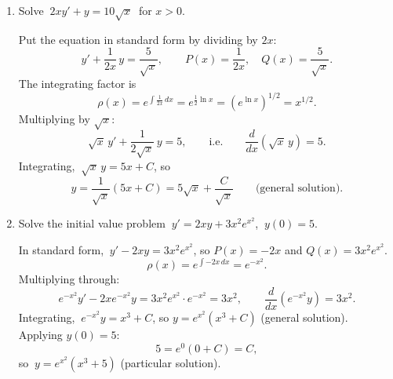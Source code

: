 \documentclass[10pt]{article}
\begin{document}
\begin{enumerate}[leftmargin=*, label=\numbox{\arabic*}]

\item
    \begin{problem}[6cm]
        Solve \(\ 2xy' + y = 10\sqrt{x}\ \) for \(x > 0\).
    \end{problem}
    \begin{solution}
        Put the equation in standard form by dividing by \(2x\):
        \[
            y' + \frac{1}{2x}\,y = \frac{5}{\sqrt{x}},
            \qquad P(x) = \frac{1}{2x}, \quad Q(x) = \frac{5}{\sqrt{x}}.
        \]
        The integrating factor is
        \[
            \rho(x) = e^{\int \frac{1}{2x}\,dx} = e^{\frac{1}{2}\ln x} = (e^{\ln x})^{1/2} = x^{1/2}.
        \]
        Multiplying by \(\sqrt{x}\):
        \[
            \sqrt{x}\,y' + \frac{1}{2\sqrt{x}}\,y = 5,
            \qquad\text{i.e.}\qquad \frac{d}{dx}\!\left(\sqrt{x}\,y\right) = 5.
        \]
        Integrating, \(\ \sqrt{x}\,y = 5x + C\), so
        \[
            y = \frac{1}{\sqrt{x}}(5x + C) = 5\sqrt{x} + \frac{C}{\sqrt{x}} \qquad\text{(general solution).}
        \]
    \end{solution}

\item
    \begin{problem}[6cm]
        Solve the initial value problem \(\ y' = 2xy + 3x^2 e^{x^2}\), \(\ y(0) = 5\).
    \end{problem}
    \begin{solution}
        In standard form, \(\ y' - 2xy = 3x^2 e^{x^2}\), so \(P(x) = -2x\) and \(Q(x) = 3x^2 e^{x^2}\).
        \[
            \rho(x) = e^{\int -2x\,dx} = e^{-x^2}.
        \]
        Multiplying through:
        \[
            e^{-x^2}y' - 2x e^{-x^2}y = 3x^2 e^{x^2}\cdot e^{-x^2} = 3x^2,
            \qquad \frac{d}{dx}\!\left(e^{-x^2}y\right) = 3x^2.
        \]
        Integrating, \(\ e^{-x^2}y = x^3 + C\), so \(y = e^{x^2}(x^3 + C)\) (general solution).
        Applying \(y(0) = 5\):
        \[
            5 = e^{0}(0 + C) = C,
        \]
        so \(\ y = e^{x^2}(x^3 + 5)\) (particular solution).
    \end{solution}


\end{enumerate}
\end{document}
